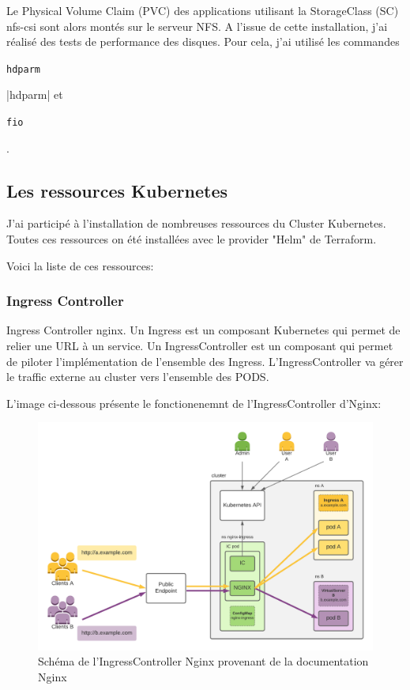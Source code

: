 \documentclass[12pt, a4paper, twoside]{article}
\begin{document}
Le Physical Volume Claim (PVC) des applications utilisant la StorageClass (SC) nfs-csi sont alors montés sur le serveur NFS.
A l'issue de cette installation, j'ai réalisé des tests de performance des disques.
Pour cela, j'ai utilisé les commandes \begin{code}\texttt{hdparm}\end{code}|hdparm| et \begin{code}\texttt{fio}\end{code}.

\subsection{Les ressources Kubernetes}
J'ai participé à l'installation de nombreuses ressources du Cluster \gls{Kubernetes}.
Toutes ces ressources on été installées avec le provider "Helm" de \gls{Terraform}.

Voici la liste de ces ressources:
\subsubsection{Ingress Controller}
Ingress Controller nginx. Un Ingress est un composant \gls{Kubernetes} qui permet de relier une URL à un service.
Un IngressController est un composant qui permet de piloter l'implémentation de l'ensemble des Ingress.
L'IngressController va gérer le traffic externe au \gls{cluster} vers l'ensemble des PODS.

L'image ci-dessous présente le fonctionenemnt de l'IngressController d'Nginx:

\begin{figure}[!ht]
    \centering
        \includegraphics[width=\textwidth]{src/graph_nginx.png}
    \caption{Schéma de l'IngressController Nginx provenant de la documentation Nginx}
    \label{fig:graph_nginx.png}
\end{figure}
\end{document}
